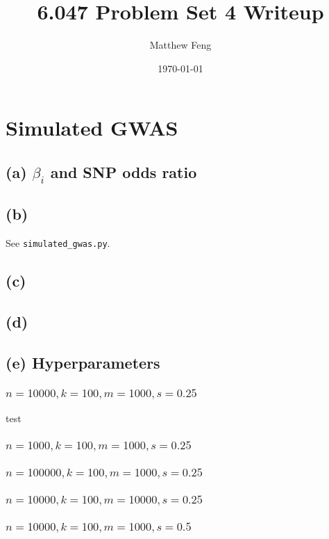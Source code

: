 \documentclass{article}[11pt]
\title{6.047 Problem Set 4 Writeup}
\author{Matthew Feng}
\date{\today}
\begin{document}
\maketitle

\section{Simulated GWAS}

\subsection*{(a) $\beta_i$ and SNP odds ratio}
\subsection*{(b)}
See {\tt simulated\_gwas.py}.

\subsection*{(c)}
\subsection*{(d)}
\subsection*{(e) Hyperparameters}
\subsubsection{$n = 10000, k = 100, m = 1000, s = 0.25$}
test

\subsubsection{$n = 1000, k = 100, m = 1000, s = 0.25$}
\subsubsection{$n = 100000, k = 100, m = 1000, s = 0.25$}
\subsubsection{$n = 10000, k = 100, m = 10000, s = 0.25$}
\subsubsection{$n = 10000, k = 100, m = 1000, s = 0.5$}
\end{document}
